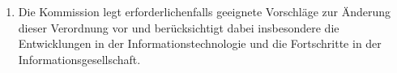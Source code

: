 \begin{enumerate}
  \item Die Kommission legt erforderlichenfalls geeignete Vorschläge zur Änderung dieser Verordnung vor und
   berücksichtigt dabei insbesondere die Entwicklungen in der Informationstechnologie und die Fortschritte in der
   Informationsgesellschaft.%
  \label{itm:97-5}

\end{enumerate}


